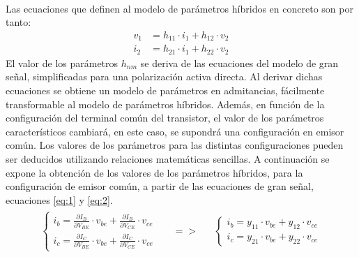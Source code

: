 \paragraph{}
Las ecuaciones que definen al modelo de par\'ametros híbridos en concreto son por tanto:
\begin{align*} 
   v_1 &= h_{11} \cdot i_1 + h_{12} \cdot v_2 \\
   i_2 &= h_{21} \cdot i_1 + h_{22} \cdot v_2
\end{align*}
El valor de los parámetros $h_{nm}$ se deriva de las ecuaciones del modelo de gran señal, simplificadas para una polarización activa directa.
Al derivar dichas ecuaciones se obtiene un modelo de parámetros en admitancias, fácilmente transformable al modelo de parámetros híbridos.
Además, en función de la configuración del terminal común del transistor, el valor de los parámetros característicos cambiará, en este caso, se supondrá una configuración en emisor común. Los valores de los parámetros para las distintas configuraciones pueden ser deducidos utilizando relaciones matemáticas sencillas.
A continuación se expone la obtención de los valores de los parámetros híbridos, para la configuración de emisor común, a partir de las ecuaciones de gran señal, ecuaciones \ref{eq:1} y \ref{eq:2}.
\[
\begin{array}{rcl} 
      \begin{array}{l}
	 \begin{cases}
	    i_b = \frac {\partial I_B}{\partial V_{BE}} \cdot v_{be} + \frac {\partial I_B}{\partial V_{CE}} \cdot v_{ce} \\
	    i_c = \frac {\partial I_C}{\partial V_{BE}} \cdot v_{be} + \frac {\partial I_C}{\partial V_{CE}} \cdot v_{ce} 
	 \end{cases}
      \end{array}
      &
      \begin{array}{l}
	  =>
      \end{array}
      &
      \begin{array}{l}
	 \begin{cases}
	 i_b = y_{11} \cdot v_{be} + y_{12} \cdot v_{ce} \\ 
	 i_c = y_{21} \cdot v_{be} + y_{22} \cdot v_{ce} 
	 \end{cases}
      \end{array}
\end{array}
\]
